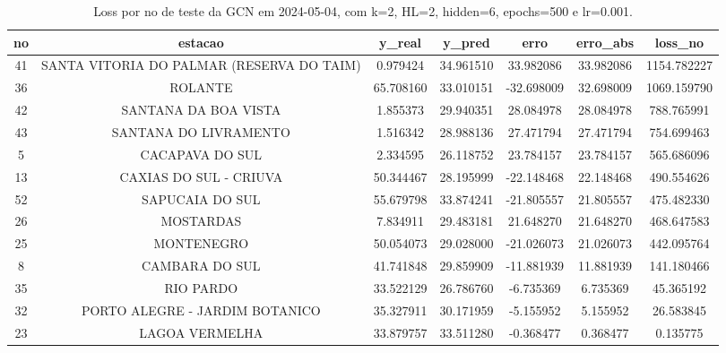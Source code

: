 \begin{table}[h]
\centering
\caption{Loss por no de teste da GCN em 2024-05-04, com k=2, HL=2, hidden=6, epochs=500 e lr=0.001.}
\label{tab:gcn_loss_k2_hl2_h6_e500_d20240504}
\begin{tabular}{ccccccc}
\toprule
no & estacao & y\_real & y\_pred & erro & erro\_abs & loss\_no \\
\midrule
41 & SANTA VITORIA DO PALMAR (RESERVA DO TAIM) & 0.979424 & 34.961510 & 33.982086 & 33.982086 & 1154.782227 \\
36 & ROLANTE & 65.708160 & 33.010151 & -32.698009 & 32.698009 & 1069.159790 \\
42 & SANTANA DA BOA VISTA & 1.855373 & 29.940351 & 28.084978 & 28.084978 & 788.765991 \\
43 & SANTANA DO LIVRAMENTO & 1.516342 & 28.988136 & 27.471794 & 27.471794 & 754.699463 \\
5 & CACAPAVA DO SUL & 2.334595 & 26.118752 & 23.784157 & 23.784157 & 565.686096 \\
13 & CAXIAS DO SUL - CRIUVA & 50.344467 & 28.195999 & -22.148468 & 22.148468 & 490.554626 \\
52 & SAPUCAIA DO SUL & 55.679798 & 33.874241 & -21.805557 & 21.805557 & 475.482330 \\
26 & MOSTARDAS & 7.834911 & 29.483181 & 21.648270 & 21.648270 & 468.647583 \\
25 & MONTENEGRO & 50.054073 & 29.028000 & -21.026073 & 21.026073 & 442.095764 \\
8 & CAMBARA DO SUL & 41.741848 & 29.859909 & -11.881939 & 11.881939 & 141.180466 \\
35 & RIO PARDO & 33.522129 & 26.786760 & -6.735369 & 6.735369 & 45.365192 \\
32 & PORTO ALEGRE - JARDIM BOTANICO & 35.327911 & 30.171959 & -5.155952 & 5.155952 & 26.583845 \\
23 & LAGOA VERMELHA & 33.879757 & 33.511280 & -0.368477 & 0.368477 & 0.135775 \\
\bottomrule
\end{tabular}
\end{table}
